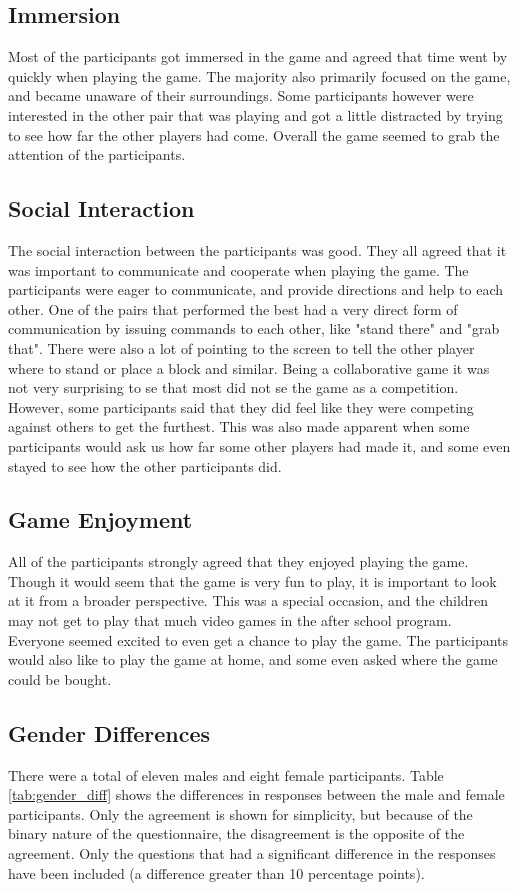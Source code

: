 \subsection{Immersion}
Most of the participants got immersed in the game and agreed that time went by quickly when playing the game. The majority also primarily focused on the game, and became unaware of their surroundings. Some participants however were interested in the other pair that was playing and got a little distracted by trying to see how far the other players had come. Overall the game seemed to grab the attention of the participants.

\subsection{Social Interaction}
The social interaction between the participants was good. They all agreed that it was important to communicate and cooperate when playing the game. The participants were eager to communicate, and provide directions and help to each other. One of the pairs that performed the best had a very direct form of communication by issuing commands to each other, like "stand there" and "grab that". There were also a lot of pointing to the screen to tell the other player where to stand or place a block and similar. Being a collaborative game it was not very surprising to se that most did not se the game as a competition. However, some participants said that they did feel like they were competing against others to get the furthest. This was also made apparent when some participants would ask us how far some other players had made it, and some even stayed to see how the other participants did.

\subsection{Game Enjoyment}
All of the participants strongly agreed that they enjoyed playing the game. Though it would seem that the game is very fun to play, it is important to look at it from a broader perspective. This was a special occasion, and the children may not get to play that much video games in the after school program. Everyone seemed excited to even get a chance to play the game. The participants would also like to play the game at home, and some even asked where the game could be bought.

\subsection{Gender Differences}
There were a total of eleven males and eight female participants. Table \ref{tab:gender_diff} shows the differences in responses between the male and female participants. Only the agreement is shown for simplicity, but because of the binary nature of the questionnaire, the disagreement is the opposite of the agreement. Only the questions that had a significant difference in the responses have been included (a difference greater than 10 percentage points).

